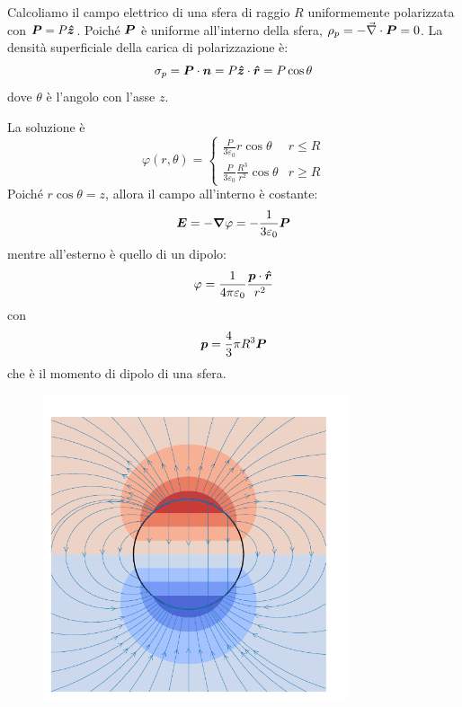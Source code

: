 \begin{Es}
  Calcoliamo il campo elettrico di una sfera di raggio $R$ uniformemente polarizzata con $\boldsymbol{P}=P\boldsymbol{\hat {z}}$. Poiché $\boldsymbol{P}$ è uniforme all'interno della sfera, $\rho_p=-\vec\nabla \cdot\boldsymbol{P}=0$. La densità superficiale della carica di polarizzazione è:
  \[
    \sigma_p=\boldsymbol{P}\cdot\boldsymbol{n}=P \boldsymbol{\hat {z}}\cdot\boldsymbol{\hat {r}}=P \cos\theta
  \]
  dove $\theta$ è l'angolo con l'asse $z$.

  La soluzione è
\[
 \varphi(r, \theta) = \begin{cases}
  \frac{P}{3\varepsilon_0}r \cos\theta & r\leq R\\
  \frac{P}{3\varepsilon_0}\frac{R^3}{r^2}\cos\theta & r\geq R
\end{cases}
\]
Poiché $r\cos\theta=z$, allora il campo all'interno è costante:
\[
\boldsymbol{E} = -\boldsymbol{\nabla} \varphi = -\frac{1}{3\varepsilon_0}\boldsymbol{P}
\]
mentre all'esterno è quello di un dipolo:
\[
\varphi = \frac{1}{4\pi \varepsilon_0}\frac{\boldsymbol{p}\cdot \boldsymbol{\hat {r}}}{r^2}
\]
con
\[
\boldsymbol{p} = \frac{4}{3}\pi R^3 \boldsymbol{P}
\]
che è il momento di dipolo di una sfera.
\begin{figure}
  \centering
  \includegraphics[width=0.8\textwidth]{immagini/fisica2/sphere_polarized.pdf}
\end{figure}
\end{Es}

